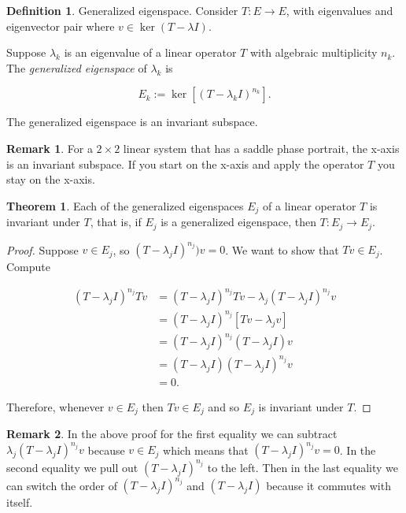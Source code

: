 \documentclass[12pt]{article}
\theoremstyle{definition}
\newtheorem*{definition}{Definition}
\newtheorem{theorem}{Theorem}[section]  %
\newtheorem*{remark}{Remark}
\begin{document}
\begin{definition} Generalized eigenspace.
Consider $T : E \rightarrow E$, with eigenvalues and eigenvector pair where $v \in \ker (T - \lambda I)$.

Suppose $\lambda_k$ is an eigenvalue of a linear operator $T$ with algebraic multiplicity $n_k$. The
\textit{generalized eigenspace} of $\lambda_k$ is

\[
E_k := \ker \left[ (T - \lambda_k I)^{n_k} \right].
\]
\end{definition}

The generalized eigenspace is an invariant subspace.

\begin{remark}
For a $2 \times 2$ linear system that has a saddle phase portrait, the x-axis is an invariant subspace. If you start on the x-axis
and apply the operator $T$ you stay on the x-axis.
\end{remark}

\begin{theorem}
Each of the generalized eigenspaces $E_j$ of a linear operator $T$ is invariant under $T$, that is, if $E_j$ is a generalized
eigenspace, then $T : E_j \rightarrow E_j$.
\end{theorem}

\begin{proof}
Suppose $v \in E_j$, so $(T - \lambda_j I )^{n_{j}})v = 0$. We want to show that $Tv \in E_j$. Compute

\begin{equation*}
\begin{split}
(T - \lambda_j I)^{n_{j}} Tv &= (T - \lambda_j I)^{n_{j}} Tv - \lambda_j (T - \lambda_j I)^{n_{j}} v \\
&= (T - \lambda_j I)^{n_{j}} [Tv - \lambda_j v] \\
&= (T - \lambda_j I)^{n_{j}} (T - \lambda_j I)v \\
&= (T - \lambda_j I) (T - \lambda_j I)^{n_{j}} v \\
&= 0.
\end{split}
\end{equation*}

Therefore, whenever $v \in E_j$ then $Tv \in E_j$ and so $E_j$ is invariant under $T$.

\end{proof}


\begin{remark}
In the above proof for the first equality we can subtract $\lambda_j (T - \lambda_j I)^{n_{j}} v$ because $v \in E_j$ 
which means that $(T - \lambda_j I)^{n_{j}} v = 0$. In the second equality we pull out $(T - \lambda_j I) ^{n_j}$ to the left.
Then in the last equality we can switch the order of $(T - \lambda_j I)^{n_j}$ and $(T - \lambda_j I)$ because it commutes
with itself.
\end{remark}
\end{document}
